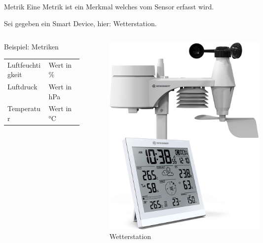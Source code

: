 \documentclass[12pt, pdf, xcolor={table, dvipsnames}, paperheight=8cm,paperwidth=12cm]{beamer}
\begin{document}
\begin{frame}{Metrik}
	Eine Metrik ist ein Merkmal welches vom Sensor erfasst wird.
	
	\vspace{1em}
	Sei gegeben ein Smart Device, hier: Wetterstation.
	
	\vspace{1em}
	\noindent
	\begin{columns}
		\begin{column}{.5\linewidth}
			\begin{block}{Beispiel: Metriken}
				\vspace{.5em}
				\begin{tabularx}{\linewidth}{lX}
					Luftfeuchtigkeit & Wert in \%\\
					Luftdruck & Wert in hPa\\
					Temperatur & Wert in °C\\
				\end{tabularx}
			\end{block}
		\end{column}%
		\begin{column}{.45\linewidth}
			\begin{figure}[h]
				\centering
				\centering\includegraphics[width=0.5\textwidth]{assets/images/wetterstation.jpg}
				\caption{Wetterstation\footnotemark[1]}
				\label{fig:mesh1}
			\end{figure}
		\end{column}%
	\end{columns}
\end{frame}
\end{document}
